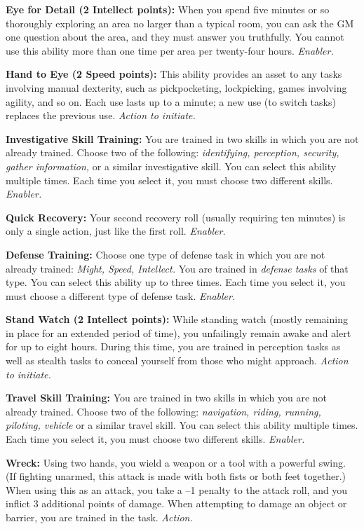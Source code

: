 \documentclass[a4paper,10pt,final,twocolumn,oneside]{book}
\newcommand{\itemAbility}[2]{\textcolor{25gray}{\textbullet\textbf{ #1:}}{ #2}\par}
\newcommand{\enabler}{\textit{ Enabler.}}
\newcommand{\action}{\textit{ Action.}}
\newcommand{\actionInit}{\textit{ Action to initiate.}}
\begin{document}
\itemAbility{Eye for Detail (2 Intellect points)}{When you spend five minutes or so thoroughly exploring an area no larger than a typical room, you can ask the GM one question about the area, and they must answer you truthfully. You cannot use this ability more than one time per area per twenty-four hours.\enabler}

\itemAbility{Hand to Eye (2 Speed points)}{This ability provides an asset to any tasks involving manual dexterity, such as pickpocketing, lockpicking, games involving agility, and so on. Each use lasts up to a minute; a new use (to switch tasks) replaces the previous use.\actionInit}

\itemAbility{Investigative Skill Training}{You are trained in two skills in which you are not already trained. Choose two of the following: \textit{identifying, perception, security, gather information,} or a similar investigative skill. You can select this ability multiple times. Each time you select it, you must choose two different skills.\enabler}

\itemAbility{Quick Recovery}{Your second recovery roll (usually requiring ten minutes) is only a single action, just like the first roll.\enabler}

\itemAbility{Defense Training}{Choose one type of defense task in which you are not already trained: \textit{Might, Speed, Intellect.} You are trained in \emph{defense tasks} of that type. You can select this ability up to three times. Each time you select it, you must choose a different type of defense task.\enabler}

\itemAbility{Stand Watch (2 Intellect points)}{While standing watch (mostly remaining in place for an extended period of time), you unfailingly remain awake and alert for up to eight hours. During this time, you are trained in perception tasks as well as stealth tasks to conceal yourself from those who might approach.\actionInit}

\itemAbility{Travel Skill Training}{You are trained in two skills in which you are not already trained. Choose two of the following: \textit{navigation, riding, running, piloting, vehicle} or a similar travel skill. You can select this ability multiple times. Each time you select it, you must choose two different skills.\enabler}

\itemAbility{Wreck}{Using two hands, you wield a weapon or a tool with a powerful swing. (If fighting unarmed, this attack is made with both fists or both feet together.) When using this as an attack, you take a –1 penalty to the attack roll, and you inflict 3 additional points of damage. When attempting to damage an object or barrier, you are trained in the task. \action}
\end{document}
